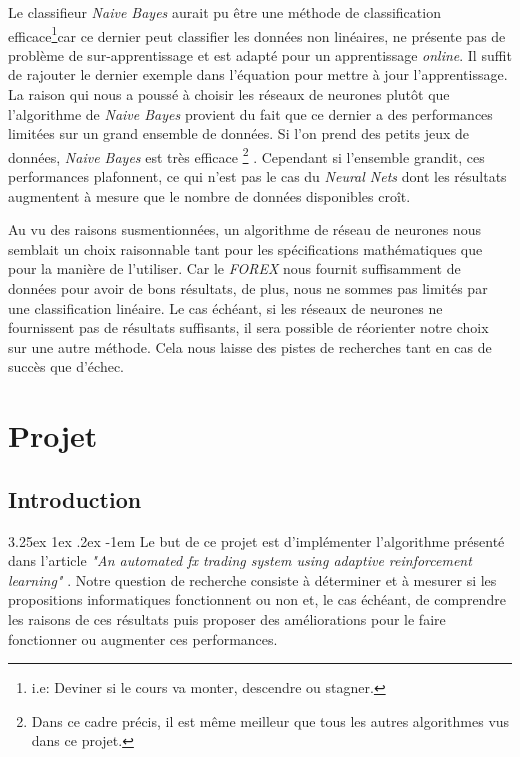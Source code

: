 \documentclass[a4paper, 11pt]{article}
\makeatletter
\renewcommand\paragraph{\@startsection{paragraph}{5}{\z@}%
  {3.25ex \@plus1ex \@minus.2ex}%
  {-1em}%
  {\normalfont\normalsize\bfseries}}
\makeatother
\begin{document}
Le classifieur \textit{Naive Bayes} aurait pu être une méthode de classification efficace\footnote{i.e: Deviner si le cours va monter, descendre ou stagner.}car ce dernier peut classifier les données non linéaires,
ne présente pas de problème de sur-apprentissage et est adapté pour un apprentissage \textit{online}. Il suffit de rajouter le
dernier exemple dans l'équation pour mettre à jour l'apprentissage. La raison qui nous a poussé à choisir les réseaux de neurones 
plutôt que l'algorithme de \textit{Naive Bayes} provient du fait que ce dernier a des performances limitées sur un grand ensemble de données.
Si l'on prend des petits jeux de données, \textit{Naive Bayes} est très efficace
\footnote{Dans ce cadre précis, il est même meilleur que tous les autres algorithmes vus dans ce projet.}
\cite{ml_petites_donnees}.
Cependant si l'ensemble grandit, ces performances plafonnent, ce qui n'est pas le cas du \textit{Neural Nets} dont les
résultats augmentent à mesure que le nombre de données disponibles croît.

Au vu des raisons susmentionnées, un algorithme de réseau de neurones nous semblait un choix raisonnable tant pour les spécifications mathématiques que pour la manière de l'utiliser. Car le \textit{FOREX} nous
fournit suffisamment de données pour avoir de bons résultats, de plus, nous ne sommes pas limités par une classification linéaire.
Le cas échéant, si les réseaux de neurones ne fournissent pas de résultats suffisants, il sera possible de réorienter notre choix sur une autre méthode. Cela nous laisse des pistes de recherches tant en cas de succès que d'échec.


\newpage
\section{Projet}
\subsection{Introduction}
\paragraph{}
Le but de ce projet est d'implémenter l'algorithme présenté dans l'article \textit{"An automated fx trading system using adaptive
reinforcement learning"} \cite{fx_trading}. Notre question de recherche consiste à déterminer et à mesurer si les propositions informatiques
fonctionnent ou non et, le cas
échéant, de comprendre les raisons de ces résultats puis proposer des améliorations pour le faire fonctionner ou augmenter ces performances.
\end{document}

